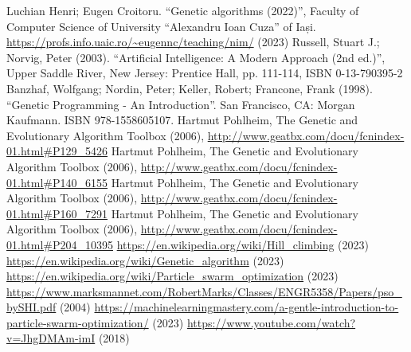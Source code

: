 \documentclass[conference]{IEEEtran}
\begin{document}
\begin{thebibliography}{00}
     Luchian Henri; Eugen Croitoru. ``Genetic algorithms (2022)'', Faculty of Computer Science of University ``Alexandru Ioan Cuza'' of Iași.
     \url{https://profs.info.uaic.ro/~eugennc/teaching/nim/} (2023)
     Russell, Stuart J.; Norvig, Peter (2003). ``Artificial Intelligence: A Modern Approach (2nd ed.)'', Upper Saddle River, New Jersey: Prentice Hall, pp. 111-114, ISBN 0-13-790395-2 
     Banzhaf, Wolfgang; Nordin, Peter; Keller, Robert; Francone, Frank (1998). ``Genetic Programming - An Introduction''. San Francisco, CA: Morgan Kaufmann. ISBN 978-1558605107.
     Hartmut Pohlheim, The Genetic and Evolutionary Algorithm Toolbox (2006), \url{http://www.geatbx.com/docu/fcnindex-01.html#P129_5426}
     Hartmut Pohlheim, The Genetic and Evolutionary Algorithm Toolbox (2006), \url{http://www.geatbx.com/docu/fcnindex-01.html#P140_6155}
     Hartmut Pohlheim, The Genetic and Evolutionary Algorithm Toolbox (2006), \url{http://www.geatbx.com/docu/fcnindex-01.html#P160_7291}
     Hartmut Pohlheim, The Genetic and Evolutionary Algorithm Toolbox (2006), \url{http://www.geatbx.com/docu/fcnindex-01.html#P204_10395}
     \url{https://en.wikipedia.org/wiki/Hill_climbing} (2023)
     \url{https://en.wikipedia.org/wiki/Genetic_algorithm} (2023)
     \url{https://en.wikipedia.org/wiki/Particle_swarm_optimization} (2023)
     \url{https://www.marksmannet.com/RobertMarks/Classes/ENGR5358/Papers/pso_bySHI.pdf} (2004)
     \url{https://machinelearningmastery.com/a-gentle-introduction-to-particle-swarm-optimization/} (2023)
     \url{https://www.youtube.com/watch?v=JhgDMAm-imI} (2018)
\end{thebibliography}
    
\end{document}
